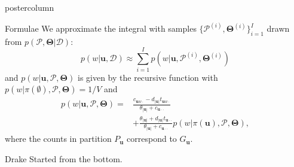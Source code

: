 \documentclass[roundedcorners=true, titleposition=left]{beamerthemeruhuisstijlposter}
\begin{document}
\begin{frame}
\begin{columns}
\begin{column}{0.19\textwidth}
\begin{beamercolorbox}[center, wd=\textwidth]{postercolumn}
\begin{minipage}[T]{0.95\textwidth}
\parbox[t][\columnheight]{\textwidth}{%
  \begin{block}{Formulae}
    	We approximate the integral with samples $\{\mathcal{P}^{(i)}, \boldsymbol\Theta^{(i)}\}_{i=1}^I$ drawn from $p(\mathcal{P}, \boldsymbol\Theta|\mathcal{D})$: 
  	\begin{equation}
    	p(w|\mathbf{u},\mathcal{D})\approx\sum_{i=1}^{I}p(w|\mathbf{u},\mathcal{P}^{(i)},\boldsymbol\Theta^{(i)})
        \end{equation}
  and $p(w|\mathbf{u}, \mathcal{P},\boldsymbol\Theta)$ is given by the recursive function with  $p(w|\pi(\emptyset),\mathcal{P},\boldsymbol\Theta) = 1/V$ and 
  \begin{equation}
  	\begin{split}
    	p(w|\mathbf{u},\mathcal{P},\boldsymbol\Theta) = &\frac{c_{\mathbf{u}w\cdot}-d_{|\mathbf{u}|}t_{\mathbf{u}w\cdot}}{\theta_{|\mathbf{u}|}+c_{\mathbf{u}\cdot\cdot}} \\
        &+ \frac{\theta_{|\mathbf{u}|}+d_{|\mathbf{u}|}t_{\mathbf{u}\cdot\cdot}}{\theta_{|\mathbf{u}|}+c_{\mathbf{u}\cdot\cdot}} p(w|\pi(\mathbf{u}),\mathcal{P},\boldsymbol\Theta),
        \end{split}
        \end{equation}
        where the counts in partition $P_{\mathbf{u}}$ correspond to $G_{\mathbf{u}}$.
    \end{block}
    \vfill
    \begin{block}{Drake}
    	Started from the bottom.
    \end{block}
}
\end{minipage}
\end{beamercolorbox}
\end{column}


\end{columns}
\end{frame}
\end{document}
